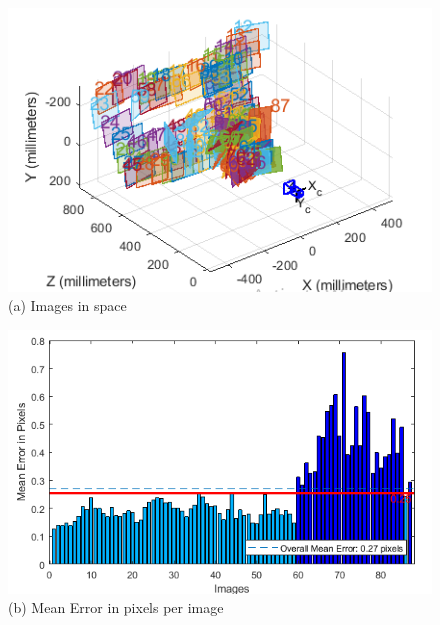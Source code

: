 \begin{figure} [H]
	\centering
    \begin{minipage}{.4\textwidth}
      \centering
      \includegraphics[width=\linewidth]{../Photos/CameraCalibration/1920x1080/calib-samples.png}\\
      {(a) Images in  space }
    \end{minipage}%
    \begin{minipage}{.6\textwidth}
      \centering
      \includegraphics[width=\linewidth]{../Photos/CameraCalibration/1920x1080/calib-mean-error.png}\\
      {(b) Mean Error in pixels per image }
	\end{minipage}
    \hfill \break
    \decoRule
    \label{fig:matlab-useful-graphs}
\end{figure}

